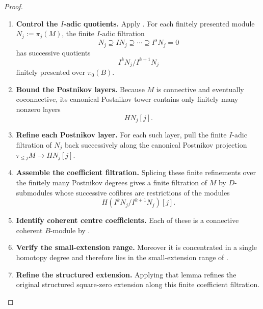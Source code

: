 \begin{proof}
\begin{enumerate}[label=\textup{(\arabic*)}]
    This ideal is nilpotent. Since \(D\to B\) is Artinian,
     makes \(I\) finitely
    presented over \(\pi_0(D)\).
    \item \textbf{Control the \(I\)-adic quotients.}
    Apply
    . For each finitely presented module
    \(N_j:=\pi_j(M)\), the finite \(I\)-adic filtration
    \[
        N_j\supseteq IN_j\supseteq\cdots\supseteq I^sN_j=0
    \]
    has successive quotients
    \[
        I^kN_j/I^{k+1}N_j
    \]
    finitely presented over \(\pi_0(B)\).
    \item \textbf{Bound the Postnikov layers.}
    Because \(M\) is connective and eventually coconnective, its canonical
    Postnikov tower contains only finitely many nonzero layers
    \[
        HN_j[j].
    \]
    \item \textbf{Refine each Postnikov layer.}
    For each such layer, pull the finite \(I\)-adic filtration of \(N_j\) back
    successively along the canonical Postnikov projection
    \(\tau_{\leq j}M\to HN_j[j]\).
    \item \textbf{Assemble the coefficient filtration.}
    Splicing these finite refinements over the
    finitely many Postnikov degrees gives a finite filtration of \(M\) by
    \(D\)-submodules whose successive cofibres are restrictions of the modules
    \[
        H(I^kN_j/I^{k+1}N_j)[j].
    \]
    \item \textbf{Identify coherent centre coefficients.}
    Each of these is a connective coherent \(B\)-module by
    .
    \item \textbf{Verify the small-extension range.}
    Moreover it is concentrated in a
    single homotopy degree and therefore lies in the small-extension range of
    .
    \item \textbf{Refine the structured extension.}
    Applying that lemma
    refines the original structured square-zero extension along this finite
    coefficient filtration.
\end{enumerate}
\end{proof}

